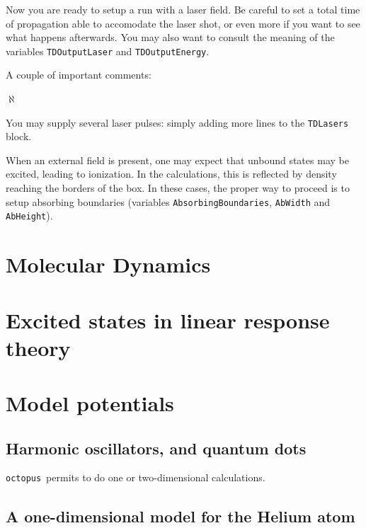 \documentclass[10pt,a4paper,twoside]{article}
\newcommand{\octopus}{{\tt octopus}\ }
\newenvironment{mylist}
{
\begin{list}{$\aleph$}
{
\setlength{\parskip}{0pt}
\setlength{\topsep}{0pt}
\setlength{\partopsep}{0pt}
\setlength{\itemsep}{0pt}
\setlength{\parsep}{0pt}
}
}
{
\end{list}
}
\begin{document}
Now you are ready to setup a run with a laser field. Be careful to set a total time
of propagation able to accomodate the laser shot, or even more if you want to see
what happens afterwards. You may also want to consult the meaning
of the variables {\tt TDOutputLaser} and {\tt TDOutputEnergy}.

A couple of important comments:
\begin{mylist}
\item You may supply several laser pulses: simply adding more lines
to the {\tt TDLasers} block.
\item When an external field is present, one may expect that unbound
states may be excited, leading to ionization. In the calculations, this
is reflected by density reaching the borders of the box. In these cases,
the proper way to proceed is to setup absorbing boundaries (variables
{\tt AbsorbingBoundaries}, {\tt AbWidth} and {\tt AbHeight}).
\end{mylist}




\section{Molecular Dynamics}

\section{Excited states in linear response theory}


\section{Model potentials}

\subsection{Harmonic oscillators, and quantum dots}

\octopus permits to do one or two-dimensional calculations.

\subsection{A one-dimensional model for the Helium atom}
\end{document}
